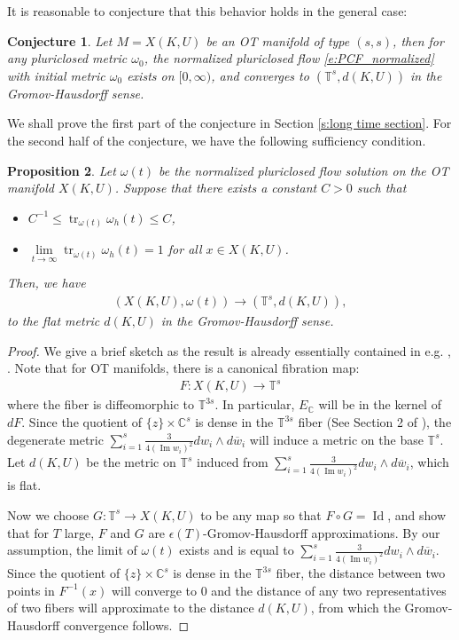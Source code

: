 \documentclass[12pt]{amsart}
\numberwithin{equation}{section}
\newtheorem{prop}{Proposition}
\newtheorem{conj}[prop]{Conjecture}
\numberwithin{prop}{section}
\theoremstyle{definition}
\renewcommand{\bar}[1]{\overline{#1}}
\begin{document}
\noindent It is reasonable to conjecture that this behavior holds in the general case:
\begin{conj} \label{c:OT_PCF} Let $M = X(K,U)$ be an OT manifold of type $(s,s)$, then for any pluriclosed metric $\omega_0$, the normalized pluriclosed flow \ref{e:PCF_normalized} with initial metric $\omega_0$ exists on $[0, \infty)$, and converges to $(\mathbb{T}^s,d(K, U))$ in the Gromov-Hausdorff sense.
\end{conj}

We shall prove the first part of the conjecture in Section \ref{s:long time section}. For the second half of the conjecture, we have the following sufficiency condition.
\begin{prop}\label{p:GH convergence argument}
    Let $\omega(t)$ be the normalized pluriclosed flow solution on the OT manifold $X(K,U)$. Suppose that there exists a constant $C>0$ such that 
    \begin{itemize}
        \item $C^{-1}\leq \operatorname{tr}_{\omega(t)}\omega_h(t)\leq C$,
        \item $\lim\limits_{t\to\infty}\operatorname{tr}_{\omega(t)}\omega_h(t) = 1$ for all $x\in X(K,U)$.
    \end{itemize}
    Then, we have
    \begin{align*}
    (X(K,U),\omega(t))\to (\mathbb{T}^s,d(K, U)),
\end{align*}
to the flat metric $d(K,U)$ in the Gromov-Hausdorff sense.
\end{prop}
\begin{proof} We give a brief sketch as the result is already essentially contained in e.g. \cite{fusi2024pluriclosed}, \cite{ZhengOT}.  Note that for OT manifolds, there is a canonical fibration map:
    \begin{align*}
        F:X(K,U)\to \mathbb{T}^s
    \end{align*}
    where the fiber is diffeomorphic to $\mathbb{T}^{3s}$.  In particular, $E_\mathbb{C}$ will be in the kernel of $dF$. Since the quotient of $\{z\}\times \mathbb{C}^s$ is dense in the $\mathbb{T}^{3s}$ fiber (See Section 2 of \cite{VerbiOT}), the degenerate metric $\sum_{i=1}^s \frac{3}{4(\operatorname{Im}w_i)^2}dw_i\wedge d\bar{w}_i$ will induce a metric on the base $\mathbb{T}^s$. Let $d(K,U)$ be the metric on $\mathbb{T}^s$ induced from $\sum_{i=1}^s \frac{3}{4(\operatorname{Im}w_i)^2}dw_i\wedge d\bar{w}_i$, which is flat.

    Now we choose $G:\mathbb{T}^s\to X(K,U)$ to be any map so that $F\circ G = \operatorname{Id}$, and show that for $T$ large, $F$ and $G$ are $\epsilon(T)$-Gromov-Hausdorff approximations. By our assumption, the limit of $\omega(t)$ exists and is equal to $\sum_{i=1}^s \frac{3}{4(\operatorname{Im}w_i)^2}dw_i\wedge d\bar{w}_i$. Since the quotient of $\{z\}\times \mathbb{C}^s$ is dense in the $\mathbb{T}^{3s}$ fiber, the distance between two points in $F^{-1}(x)$ will converge to $0$ and the distance of any two representatives of two fibers will approximate to the distance $d(K,U)$, from which the Gromov-Hausdorff convergence follows.
\end{proof}
\end{document}
